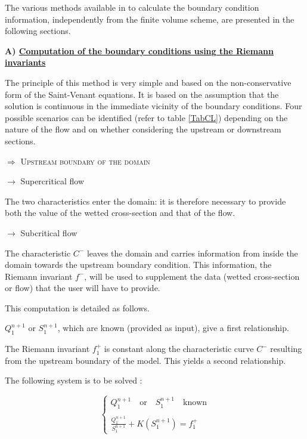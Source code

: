 The various methods available in \mascaret{} to calculate the boundary condition information, independently from the finite volume scheme, are presented in the following sections.

\textbf{A) \underline{Computation of the boundary conditions using the Riemann invariants}}

The principle of this method is very simple and based on the non-\linebreak conservative form of the Saint-Venant equations. It is based on the assumption that the solution is continuous in the immediate vicinity of the boundary conditions. Four possible scenarios can be identified (refer to table \ref{TabCL}) depending on the nature of the flow and on whether considering the upstream or downstream sections.

$\Longrightarrow$ \textsc{Upstream boundary of the domain}

$\rightarrow$ Supercritical flow

The two characteristics enter the domain: it is therefore necessary to provide both the value of the wetted cross-section and that of the flow.

$\rightarrow$ Subcritical flow

The characteristic $C^-$ leaves the domain and carries information from inside the domain towards the upstream boundary condition. This information, the Riemann invariant $f^-$, will be used to supplement the data (wetted cross-section or flow) that the user will have to provide.

This computation is detailed as follows.

$Q_1^{n+1}$ or $S_1^{n+1}$, which are known (provided as input), give a first relationship.

The Riemann invariant $f_{1}^+$ is constant along the characteristic curve $C^-$ resulting from the upstream boundary of the model. This yields a second relationship.

The following system is to be solved :

\begin{equation}
 \left \lbrace
  \begin{array}{l}
    Q_{1}^{n+1} \quad \mbox{or} \quad S_{1}^{n+1} \quad \mbox{known} \\
    \\
    \frac{Q_{1}^{n+1}}{S_{1}^{n+1}} + K(S_{1}^{n+1}) = f_{1}^+
  \end{array}
 \right.
\end{equation}

